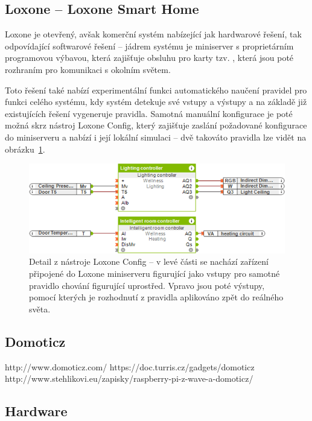 \subsection{Loxone -- Loxone Smart Home}\label{subsec:loxone}
Loxone je otevřený, avšak komerční systém nabízející jak hardwarové řešení, tak odpovídající softwarové řešení --
jádrem systému je miniserver s proprietárním programovou výbavou, která zajišťuje obsluhu pro karty tzv. , která jsou poté rozhraním pro komunikaci s okolním světem.

Toto řešení také nabízí experimentální funkci automatického naučení pravidel pro funkci celého systému, kdy
systém detekuje své vstupy a výstupy a na základě již existujících řešení vygeneruje pravidla.
Samotná manuální konfigurace je poté možná skrz nástroj Loxone Config, který zajišťuje zaslání požadované
konfigurace do miniserveru a nabízí i její lokální simulaci -- dvě takováto pravidla lze vidět na
obrázku~\ref{fig:iot-loxone-config}.

\begin{figure}%
    \centering
    \includegraphics[width=\textwidth]{figures/iot-loxone-config.png}
    \caption{Detail z nástroje Loxone Config -- v levé části se nachází zařízení připojené do Loxone miniserveru
    figurující jako vstupy pro samotné pravidlo chování figurující uprostřed. %
    Vpravo jsou poté výstupy, pomocí kterých je rozhodnutí z pravidla aplikováno zpět do reálného světa.}
    \label{fig:iot-loxone-config}
\end{figure}

\subsection{Domoticz}\label{subsec:domoticz}
http://www.domoticz.com/
https://doc.turris.cz/gadgets/domoticz
http://www.stehlikovi.eu/zapisky/raspberry-pi-z-wave-a-domoticz/

\subsection{Hardware}

